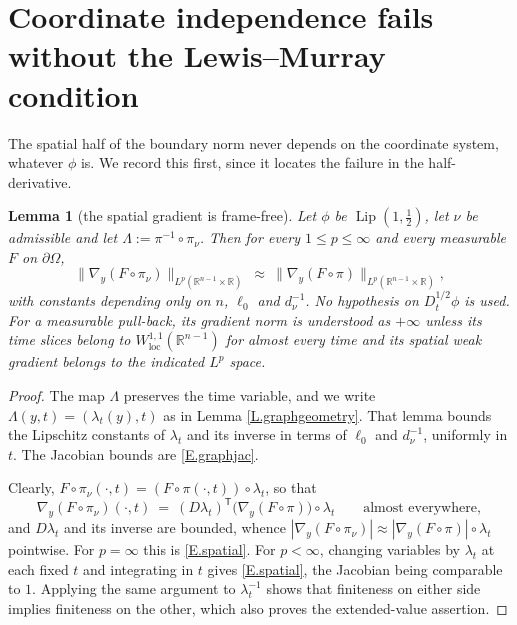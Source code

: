 \documentclass[10pt,a4paper]{amsart}
\numberwithin{equation}{section}
\DeclareMathOperator{\Lip}{Lip}
\DeclareMathOperator{\loc}{loc}
\newcommand{\R}{\mathbb R}
\newcommand{\abs}[1]{\left\vert#1\right\vert}
\newcommand{\br}[1]{\left(#1\right)}
\newcommand{\pom}{\partial\Omega}
\newcommand{\dhalf}{D_t^{1/2}}
\newtheorem{lemma}[equation]{Lemma}
\begin{document}
\section{Coordinate independence fails without the Lewis--Murray condition}
\label{S.counter}

The spatial half of the boundary norm never depends on the coordinate system,
whatever $\phi$ is. We record this first, since it locates the failure in the
half-derivative.

\begin{lemma}[the spatial gradient is frame-free]\label{L.spatial}
Let $\phi$ be $\Lip(1,\tfrac12)$, let $\nu$ be admissible and let
$\Lambda:=\pi^{-1}\circ\pi_\nu$. Then for every $1\le p\le\infty$ and every
measurable $F$ on $\pom$,
\begin{equation}\label{E.spatial}
  \big\|\nabla_y\br{F\circ\pi_\nu}\big\|_{L^p(\R^{n-1}\times\R)}
  \ \approx\ \big\|\nabla_y\br{F\circ\pi}\big\|_{L^p(\R^{n-1}\times\R)} ,
\end{equation}
with constants depending only on $n$, $\ell_0$ and $d_\nu^{-1}$. No
hypothesis on $\dhalf\phi$ is used.
For a measurable pull-back, its gradient norm is understood as $+\infty$
unless its time slices belong to $W^{1,1}_{\loc}(\R^{n-1})$ for almost every
time and its spatial weak gradient belongs to the indicated $L^p$ space.
\end{lemma}

\begin{proof}
The map $\Lambda$ preserves the time variable, and we write
$\Lambda(y,t)=(\lambda_t(y),t)$ as in Lemma \ref{L.graphgeometry}.
That lemma bounds the Lipschitz constants of $\lambda_t$ and its inverse
in terms of $\ell_0$ and $d_\nu^{-1}$, uniformly in $t$.
The Jacobian bounds are \eqref{E.graphjac}.\medskip

Clearly, $F\circ\pi_\nu(\cdot,t)=\br{F\circ\pi(\cdot,t)}\circ\lambda_t$, so that
$$\nabla_y\br{F\circ\pi_\nu}(\cdot,t)
  \ =\ \br{D\lambda_t}^{\mathsf T}
   \Big(\nabla_y\br{F\circ\pi}\Big)\circ\lambda_t
  \qquad\text{almost everywhere},$$
and $D\lambda_t$ and its inverse are bounded, whence
$\abs{\nabla_y(F\circ\pi_\nu)}\approx\abs{\nabla_y(F\circ\pi)}\circ\lambda_t$
pointwise. For $p=\infty$ this is \eqref{E.spatial}. For $p<\infty$, changing
variables by $\lambda_t$ at each fixed $t$ and integrating in $t$ gives
\eqref{E.spatial}, the Jacobian being comparable to $1$.
Applying the same argument to $\lambda_t^{-1}$ shows that finiteness on
either side implies finiteness on the other, which also proves the
extended-value assertion.
\end{proof}
\end{document}
